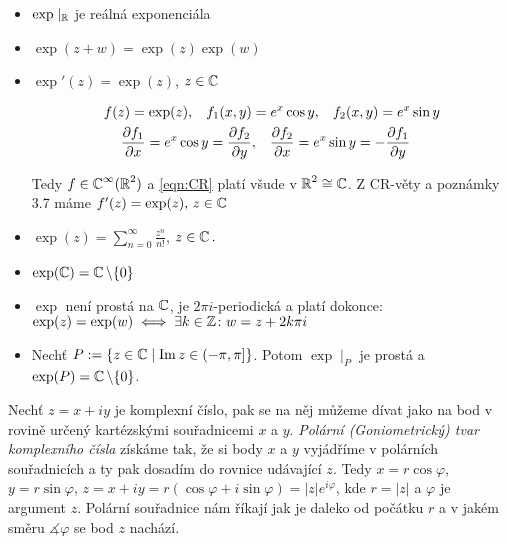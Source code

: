 \begin{properties}
\mbox{}
\vspace{-2em}
\begin{itemize}    
    \item $\exp \mid_{\operatorname{\mathbb{R}}} $ je reálná exponenciála 
    \item $\exp(z+w)=\exp(z)\exp(w)$
    \item $\exp'(z)=\exp(z)$, $ z \in\operatorname{\mathbb{C}}  $
 
 \begin{equation}
 \begin{aligned}
    f(z) = \exp(z), \hspace{3mm}
    f_1(x,y) &=e^x \cos y, \hspace{3mm}
    f_2(x,y) =e^x\sin y\\
    \frac{\partial f_1}{\partial x} = e^x\cos y = \frac{\partial f_2}{\partial y}&, \hspace{3mm}
     \frac{\partial f_2}{\partial x} = e^x \sin y= - \frac{\partial f_1}{\partial y}
\end{aligned}
\end{equation}
   
     
     
     
    Tedy $f\in\operatorname{\mathbb{C}}^{\infty}(\operatorname{\mathbb{R}} ^2)$ %
    a \cref{eqn:CR} platí všude v $\operatorname{\mathbb{R}} ^2\cong\operatorname{\mathbb{C}}  $. Z CR-věty a poznámky 3.7 máme $f'(z)=\exp(z)\text{, } z\in\operatorname{\mathbb{C}}  $
    \item $\exp(z)=\sum_{n=0}^{\infty}\frac{z^n}{n!}$, $z\in\operatorname{\mathbb{C}}  \text{.}$
    \item $\exp(\operatorname{\mathbb{C}}  )=\operatorname{\mathbb{C}}  \setminus\{0\}$ 
    \item $\exp$ není prostá na $\operatorname{\mathbb{C}}  $, je $2\pi i$-periodická a platí dokonce:
    \newline
    $\exp(z) =\exp(w) \iff\exists k \in\operatorname{\mathbb{Z}} \colon w=z+2k\pi i$
     \item Nechť $P:=\{z\in\operatorname{\mathbb{C}}  \mid \operatorname{Im} z \in \left (-\pi,\pi\right ]\}$.
     Potom $\exp\mid_P$ je prostá a $\exp(P)=\operatorname{\mathbb{C}}  \setminus\{0\}$.
    \newline
  \end{itemize}  
  \end{properties}
  \begin{note}
    Nechť $z=x+iy$ je komplexní číslo, pak se na něj můžeme dívat jako na bod v rovině určený kartézskými souřadnicemi $x$ a $y$. \emph{Polární (Goniometrický) tvar komplexního čísla} získáme tak, že si body $x$ a $y$ vyjádříme v polárních souřadnicích a ty pak dosadím do rovnice udávající $z$. Tedy
       $x=r\cos \varphi$, 
       $y=r\sin \varphi$, 
       $z=x+iy=r(\cos \varphi + i \sin \varphi)=\lvert z \rvert e^{i\varphi} $, kde $r=\lvert z \rvert$ a $\varphi$ je argument $z$.
       Polární souřadnice nám říkají jak je daleko od počátku $r$ a v jakém směru  $\measuredangle \varphi$ se bod $z$ nachází.
 \end{note}
     
